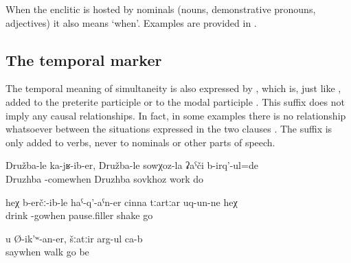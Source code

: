 When the enclitic is hosted by nominals (nouns, demonstrative pronouns, adjectives) it also means `when'. Examples are provided in .





\subsection{The temporal marker  }
\label{sec:enclitic =er}

The temporal meaning of simultaneity is also expressed by , which is, just like , added to the preterite participle or to the modal participle . This suffix does not imply any causal relationships. In fact, in some examples there is no relationship whatsoever between the situations expressed in the two clauses . The suffix is only added to verbs, never to nominals or other parts of speech.
%
\begin{exe}
	\ex	\label{ex:When I moved to Druzhba, I worked in the sovkhoz in Druzhba}
	\gll	Družba-le	ka-jʁ-ib-er,	Družba-le	sowχoz-la	ʡaˁči	b-irq'-ul=de\\
		Druzhba	-comewhen	Druzhba	sovkhoz	work	do\\
	\glt	{}

	\ex	\label{ex:‎When he was drunk and went there, he staggered}
	\gll	heχ	b-erčː-ib-le	haˁ-q'-aˁn-er	cinna	tːartːar	uq-un-ne	heχ\\
			drink	-gowhen	pause.filler	shake	go	\\
	\glt	{}

	\ex	\label{ex:‎As you (masc.) say, they are walking around}
	\gll	u	Ø-ik'ʷ-an-er,	šːatːir	arg-ul	ca-b\\
			saywhen	walk	go	be\\
	\glt	{}
\end{exe}


